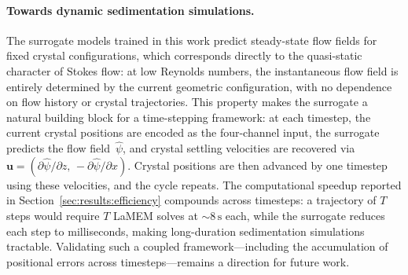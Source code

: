 \paragraph{Towards dynamic sedimentation simulations.}
The surrogate models trained in this work predict steady-state flow fields for fixed crystal configurations, which corresponds directly to the quasi-static character of Stokes flow: at low Reynolds numbers, the instantaneous flow field is entirely determined by the current geometric configuration, with no dependence on flow history or crystal trajectories. This property makes the surrogate a natural building block for a time-stepping framework: at each timestep, the current crystal positions are encoded as the four-channel input, the surrogate predicts the flow field~$\hat{\psi}$, and crystal settling velocities are recovered via $\mathbf{u} = (\partial\hat{\psi}/\partial z,\, -\partial\hat{\psi}/\partial x)$. Crystal positions are then advanced by one timestep using these velocities, and the cycle repeats. The computational speedup reported in Section~\ref{sec:results:efficiency} compounds across timesteps: a trajectory of $T$ steps would require $T$ LaMEM solves at ${\sim}8\,\text{s}$ each, while the surrogate reduces each step to milliseconds, making long-duration sedimentation simulations tractable. Validating such a coupled framework—including the accumulation of positional errors across timesteps—remains a direction for future work.